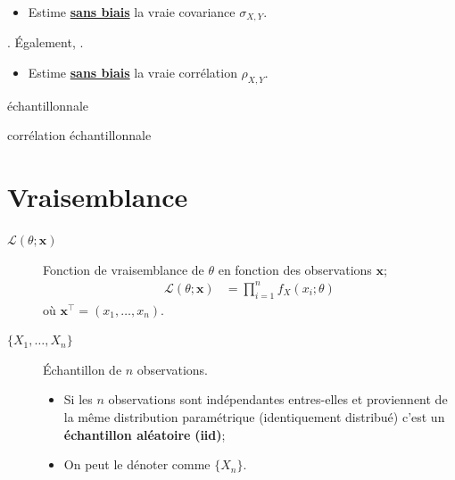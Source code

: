 \documentclass[french]{article}
\begin{document}
\begin{multicols*}{2}
\begin{definitionNOHFILLprop}
\begin{itemize}
	\item	Estime \underline{\textbf{sans biais}} la vraie covariance $\sigma_{X, Y}$.
\end{itemize}
\end{definitionNOHFILLprop}

\begin{definitionNOHFILLprop}
. Également, .

\begin{itemize}
	\item	Estime \underline{\textbf{sans biais}} la vraie corrélation $\rho_{X, Y}$.
\end{itemize}
\end{definitionNOHFILLprop}
 échantillonnale

corrélation échantillonnale


\columnbreak
\section{Vraisemblance}\label{sec:likelihood}
\begin{distributions}[Notation]
\begin{description}
	\item[$\mathcal{L}(\theta; \bm{x})$]	Fonction de vraisemblance de $\theta$ en fonction des observations $\bm{x}$;
		\begin{align*}
		\mathcal{L}(\theta; \bm{x})
		&=	\prod_{i	=	1}^{n}	f_{X}(x_{i} ; \theta)
		\end{align*}
		où $\bm{x}^{\top}	=	(x_{1}, \dots, x_{n})$.
	\item[$\{X_{1}, \dots, X_{n}\}$]	Échantillon de $n$ observations.
		\begin{itemize}[leftmargin = *]
		\item	Si les $n$ observations sont indépendantes entres-elles et proviennent de la même distribution paramétrique (identiquement distribué) c'est un \textbf{échantillon aléatoire} \textbf{(iid)};
		\item	On peut le dénoter comme $\{X_{n}\}$.
		\end{itemize}
\end{description}
\end{distributions}


\end{multicols*}
\end{document}
